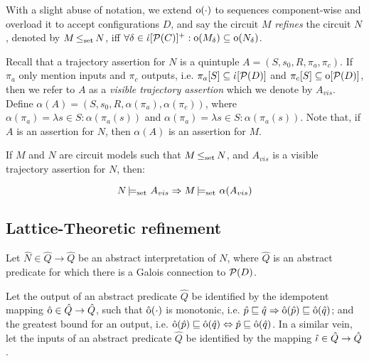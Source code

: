 
With a slight abuse of notation, we extend $\operatorname{\mathrm{o}}(\cdot)$ to sequences component-wise and overload it to accept configurations $D$, and say the circuit $M$ \textit{refines} the circuit $N$, denoted by $M \operatorname{\leq_{\textrm{set}}} N$, iff $\forall \delta \in \operatorname{\dot{\iota}}[\mathcal{P}(C)]^{+} : \operatorname{\mathrm{o}}(M_{\delta}) \subseteq \operatorname{\mathrm{o}}(N_{\delta})$.

Recall that a trajectory assertion for $N$ is a quintuple $A = (S,s_{0},R,\pi_{a},\pi_{c})$. If $\pi_{a}$ only mention inputs and $\pi_{c}$ outputs, i.e. $\pi_{a}[S] \subseteq \operatorname{\dot{\iota}}[\mathcal{P}(D)]$ and $\pi_{c}[S] \subseteq \operatorname{\mathrm{o}}[\mathcal{P}(D)]$, then we refer to $A$ as a \textit{visible trajectory assertion} which we denote by $A_{vis}$. Define $\alpha(A) = (S, s_{0}, R, \alpha(\pi_{a}), \alpha(\pi_{c}))$, where $\alpha(\pi_{a}) = \lambda s \in S : \alpha(\pi_{a}(s))$ and $\alpha(\pi_{a}) = \lambda s \in S : \alpha(\pi_{a}(s))$. Note that, if $A$ is an assertion for $N$, then $\alpha(A)$ is an assertion for $M$.

\begin{theorem}
\label{thm:refinement}
If $M$ and $N$ are circuit models such that $M \operatorname{\leq_{\textrm{set}}} N$, and $A_{vis}$ is a visible trajectory assertion for $N$, then:

\begin{equation*}
N \operatorname{\models_{\textrm{set}}} \, A_{vis} \Rightarrow M \operatorname{\models_{\textrm{set}}} \, \alpha(A_{vis})
\end{equation*}
\end{theorem}

\subsection{Lattice-Theoretic refinement}

Let $\hat N \in \hat Q \rightarrow \hat Q$ be an abstract interpretation of $N$, where $\hat Q$ is an abstract predicate for which there is a Galois connection to $\mathcal{P}(D)$.

Let the output of an abstract predicate $\hat Q$ be identified by the idempotent mapping $\operatorname{\hat{\mathrm{o}}} \in \hat Q \rightarrow \hat Q$, such that $\operatorname{\hat{\mathrm{o}}}(\cdot)$ is monotonic, i.e. $\hat p \sqsubseteq \hat q \Rightarrow \operatorname{\hat{\mathrm{o}}}(\hat p) \sqsubseteq \operatorname{\hat{\mathrm{o}}}(\hat q)$; and the greatest bound for an output, i.e. $\operatorname{\hat{\mathrm{o}}}(\hat p) \sqsubseteq \operatorname{\hat{\mathrm{o}}}(\hat q) \Leftrightarrow \hat p \sqsubseteq \operatorname{\hat{\mathrm{o}}}(\hat q)$. In a similar vein, let the inputs of an abstract predicate $\hat Q$ be identified by the mapping $\operatorname{\hat{\iota}} \in \hat Q \rightarrow \hat Q$.

